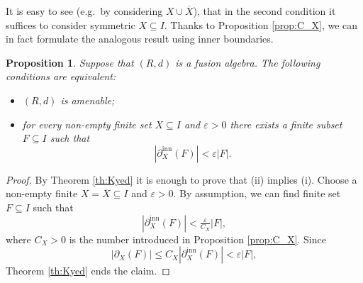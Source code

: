 \documentclass[11 pt, leqno]{amsart}
\newcommand{\eps}{\varepsilon}
\newcommand{\ov}{\overline}
\DeclareMathOperator{\supp}{supp}
\DeclareMathOperator{\inn}{inn}
\newtheorem{proposition}[theorem]{Proposition}
\theoremstyle{definition}
\numberwithin{equation}{section}
\begin{document}
It is easy to see (e.g.~by considering $X\cup \ov{X}$), that in the second condition it suffices to consider symmetric $X\subseteq I$. Thanks to Proposition \ref{prop:C_X}, we can in fact formulate the analogous result using inner boundaries.

\begin{proposition}\label{prop2}
	Suppose that $(R,d)$ is a fusion algebra.
	The following conditions are equivalent:
	\begin{itemize}
		\item[(i)] $(R,d)$ is amenable;
		\item[(ii)] for every non-empty  finite set $ X\subseteq I$ and $\eps>0$ there exists a finite subset $F\subseteq I$ such that
		\begin{equation}\label{eq4}
	|\partial_X^{\inn}(F)|< \eps |F|.
		\end{equation}
	\end{itemize}
\end{proposition}


\begin{proof}
By Theorem \ref{th:Kyed} it is enough to prove that (ii) implies (i). Choose a non-empty finite $ X=\ov{X}\subseteq I$ and $\eps>0$. By assumption, we can find finite set $F\subseteq I$ such that
\[
|\partial_{X}^{\inn}(F)| < \tfrac{ \eps}{C_X} |F|,
\]
where $C_X>0$ is the number introduced in Proposition \ref{prop:C_X}. Since
\[
|\partial_X(F)|\le C_X |\partial_X^{\inn}(F)| <\eps |F|,
\]
Theorem \ref{th:Kyed} ends the claim.
\end{proof}

\end{document}
